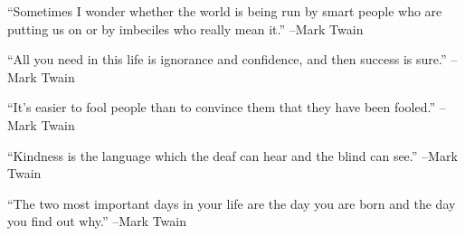 \documentclass{article}%
\begin{document}
\linebreak%
\vspace{1mm}%
\begin{minipage}{\textwidth}%
\flushleft%
“Sometimes I wonder whether the world is being run by smart people who are putting us on or by imbeciles who really mean it.”%
\linebreak%
\vspace{1mm}%
–Mark Twain%
\linebreak%
\vspace{1mm}%
\end{minipage}%
\linebreak%
\vspace{1mm}%
\begin{minipage}{\textwidth}%
\flushleft%
“All you need in this life is ignorance and confidence, and then success is sure.”%
\linebreak%
\vspace{1mm}%
–Mark Twain%
\linebreak%
\vspace{1mm}%
\end{minipage}%
\linebreak%
\vspace{1mm}%
\begin{minipage}{\textwidth}%
\flushleft%
“It's easier to fool people than to convince them that they have been fooled.”%
\linebreak%
\vspace{1mm}%
–Mark Twain%
\linebreak%
\vspace{1mm}%
\end{minipage}%
\linebreak%
\vspace{1mm}%
\begin{minipage}{\textwidth}%
\flushleft%
“Kindness is the language which the deaf can hear and the blind can see.”%
\linebreak%
\vspace{1mm}%
–Mark Twain%
\linebreak%
\vspace{1mm}%
\end{minipage}%
\linebreak%
\vspace{1mm}%
\begin{minipage}{\textwidth}%
\flushleft%
“The two most important days in your life are the day you are born and the day you find out why.”%
\linebreak%
\vspace{1mm}%
–Mark Twain%
\linebreak%
\vspace{1mm}%
\end{minipage}%
\end{document}
